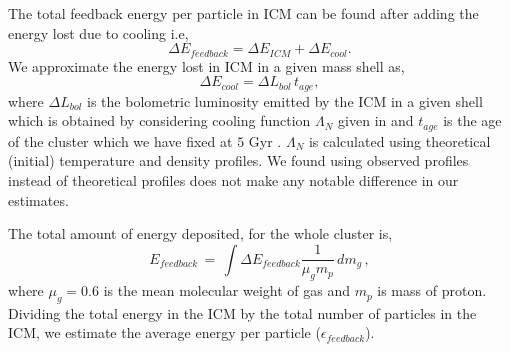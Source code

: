 \documentclass[a4paper,fleqn,usenatbib]{mnras}
\begin{document}
The total feedback energy per particle in ICM can be found after adding the energy lost due to cooling i.e,
\begin{equation}
\Delta E_{feedback}= \Delta E_{ICM}+ \Delta E_{cool}.
\label{energy}
\end{equation}
We approximate the energy lost in ICM in a given mass shell as,
\begin{equation}
 \Delta E_{cool}=\Delta L_{bol}\,t_{age},
\end{equation}
where $\Delta L_{bol}$ is the bolometric luminosity emitted by the ICM in a given shell which is obtained by considering cooling function $\Lambda_{N}$ given in \cite{Tozzi2001} and $t_{age}$ is the age of 
the cluster which we have fixed at $5$ Gyr \citep{Chaudhuri2013}. $\Lambda_{N}$ is calculated using theoretical (initial) temperature and density profiles. We found using observed profiles instead of theoretical profiles does not make any notable difference in our estimates. 

The total amount of energy deposited, for the whole cluster is,  
\begin{equation}
E_{feedback} \,= \,\int \Delta E_{feedback}\frac{1}{\mu_g m_p}  \, dm_g \,,
\end{equation}
where $\mu_g = 0.6$ is the mean molecular weight of gas and $m_p$ is mass of proton. Dividing the total energy in the ICM  by the total number of particles in the ICM, we estimate the average energy  per particle ($\epsilon_{feedback}$).
\end{document}
